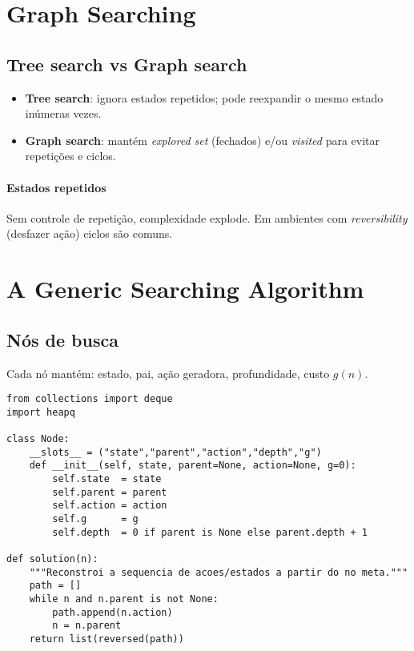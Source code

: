 \documentclass[9pt,a4paper]{extarticle}
\begin{document}
\section{Graph Searching}
\subsection*{Tree search vs Graph search}
\begin{itemize}
  \item \textbf{Tree search}: ignora estados repetidos; pode reexpandir o mesmo estado inúmeras vezes.
  \item \textbf{Graph search}: mantém \textit{explored set} (fechados) e/ou \textit{visited} para evitar repetições e ciclos.
\end{itemize}

\paragraph{Estados repetidos}
Sem controle de repetição, complexidade explode. Em ambientes com \textit{reversibility} (desfazer ação) ciclos são comuns.

\section{A Generic Searching Algorithm}
\subsection*{Nós de busca}
Cada nó mantém: estado, pai, ação geradora, profundidade, custo $g(n)$.

\begin{lstlisting}
from collections import deque
import heapq

class Node:
    __slots__ = ("state","parent","action","depth","g")
    def __init__(self, state, parent=None, action=None, g=0):
        self.state  = state
        self.parent = parent
        self.action = action
        self.g      = g
        self.depth  = 0 if parent is None else parent.depth + 1

def solution(n):
    """Reconstroi a sequencia de acoes/estados a partir do no meta."""
    path = []
    while n and n.parent is not None:
        path.append(n.action)
        n = n.parent
    return list(reversed(path))
\end{lstlisting}
\end{document}

